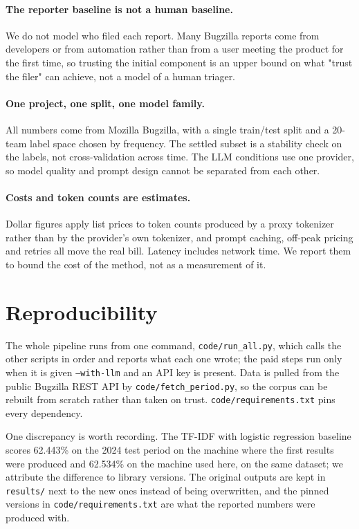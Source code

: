 \documentclass[sigconf,anonymous]{acmart}
\begin{document}
\paragraph{The reporter baseline is not a human baseline.}
We do not model who filed each report. Many Bugzilla reports come from developers or from
automation rather than from a user meeting the product for the first time, so trusting the initial
component is an upper bound on what "trust the filer" can achieve, not a model of a human triager.

\paragraph{One project, one split, one model family.}
All numbers come from Mozilla Bugzilla, with a single train/test split and a 20-team label space
chosen by frequency. The settled subset is a stability check on the labels, not cross-validation
across time. The LLM conditions use one provider, so model quality and prompt design cannot be
separated from each other.

\paragraph{Costs and token counts are estimates.}
Dollar figures apply list prices to token counts produced by a proxy tokenizer rather than by the
provider's own tokenizer, and prompt caching, off-peak pricing and retries all move the real bill.
Latency includes network time. We report them to bound the cost of the method, not as a
measurement of it.

\section{Reproducibility}
\label{sec:repro}
The whole pipeline runs from one command, \texttt{code/run\_all.py}, which calls the other scripts
in order and reports what each one wrote; the paid steps run only when it is given
\texttt{--with-llm} and an API key is present. Data is pulled from the public Bugzilla REST API by
\texttt{code/fetch\_period.py}, so the corpus can be rebuilt from scratch rather than taken on
trust. \texttt{code/requirements.txt} pins every dependency.

One discrepancy is worth recording. The TF-IDF with logistic regression baseline scores 62.443\% on
the 2024 test period on the machine where the first results were produced and 62.534\% on the
machine used here, on the same dataset; we attribute the difference to library versions. The
original outputs are kept in \texttt{results/} next to the new ones instead of being overwritten,
and the pinned versions in \texttt{code/requirements.txt} are what the reported numbers were
produced with.
\end{document}
